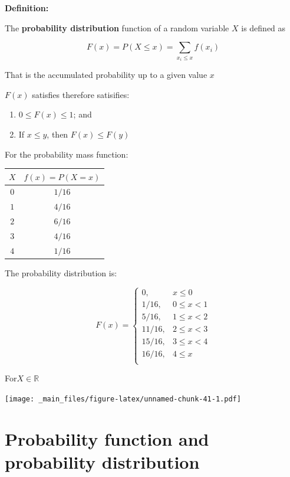 \documentclass[
]{book}
\providecommand{\tightlist}{%
  \setlength{\itemsep}{0pt}\setlength{\parskip}{0pt}}
\begin{document}
\textbf{Definition:}

The \textbf{probability distribution} function of a random variable \(X\) is defined as

\[F(x)=P(X\leq x)=\sum_{x_i\leq x} f(x_i) \]

That is the accumulated probability up to a given value \(x\)

\(F(x)\) satisfies therefore satisifies:

\begin{enumerate}
\def\labelenumi{\arabic{enumi})}
\tightlist
\item
  \(0\leq F(x) \leq 1\); and
\item
  If \(x \leq y\), then \(F(x) \leq F(y)\)
\end{enumerate}

For the probability mass function:

\begin{longtable}[]{@{}cc@{}}
\toprule\noalign{}
\(X\) & \(f(x)=P(X=x)\) \\
\midrule\noalign{}
\endhead
\bottomrule\noalign{}
\endlastfoot
\(0\) & \(1/16\) \\
\(1\) & \(4/16\) \\
\(2\) & \(6/16\) \\
\(3\) & \(4/16\) \\
\(4\) & \(1/16\) \\
\end{longtable}

The probability distribution is:

\[
    F(x)=
\begin{cases}
    0, & x \leq 0\\
    1/16,& 0 \leq x < 1\\
    5/16,& 1\leq x < 2\\
    11/16,& 2\leq x < 3\\
    15/16,& 3 \leq x < 4\\
    16/16,&   4 \leq x\\
\end{cases}
\]

For\(X \in \mathbb{R}\)

\texttt{[image: \_main\_files/figure-latex/unnamed-chunk-41-1.pdf]}

\hypertarget{probability-function-and-probability-distribution}{%
\section{Probability function and probability distribution}\label{probability-function-and-probability-distribution}}
\end{document}
